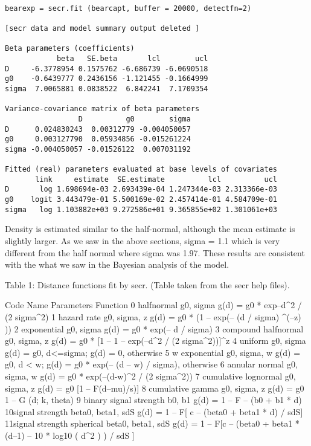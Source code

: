 {\small
\begin{verbatim}

bearexp = secr.fit (bearcapt, buffer = 20000, detectfn=2)

[secr data and model summary output deleted ]

Beta parameters (coefficients) 
            beta   SE.beta       lcl        ucl
D     -6.3778954 0.1575762 -6.686739 -6.0690518
g0    -0.6439777 0.2436156 -1.121455 -0.1664999
sigma  7.0065881 0.0838522  6.842241  7.1709354

Variance-covariance matrix of beta parameters 
                 D          g0        sigma
D      0.024830243  0.00312779 -0.004050057
g0     0.003127790  0.05934856 -0.015261224
sigma -0.004050057 -0.01526122  0.007031192

Fitted (real) parameters evaluated at base levels of covariates 
       link     estimate  SE.estimate          lcl          ucl
D       log 1.698694e-03 2.693439e-04 1.247344e-03 2.313366e-03
g0    logit 3.443479e-01 5.500169e-02 2.457414e-01 4.584709e-01
sigma   log 1.103882e+03 9.272586e+01 9.365855e+02 1.301061e+03

\end{verbatim}
}

Density is estimated similar to the half-normal, although the mean estimate is slightly larger.  As we saw in the above sections, sigma = 1.1 which is very different from the half normal where sigma was 1.97.  These results are consistent with the what we saw in the Bayesian analysis of the model.

\begin{comment} BETH: Put this table up in Section 1? \end{comment}

Table 1: Distance functions fit by secr.  (Table taken from the secr
help files).


Code Name Parameters Function 
0  halfnormal g0, sigma g(d) = g0 * exp{--d^2 / (2 sigma^2) } 
1 hazard rate g0, sigma, z g(d) = g0 * (1 -- exp(-- (d / sigma) ^(--z) )) 
2 exponential g0, sigma g(d) = g0 * exp(-- d / sigma) 
3 compound halfnormal g0, sigma, z g(d) = g0 * [1 -- {1 -- exp(--d^2 / (2 sigma^2))]^z} 
4 uniform g0, sigma g(d) = g0, d<=sigma; g(d) = 0, otherwise 
5 w exponential g0, sigma, w g(d) = g0, d < w; g(d) = g0 * exp(-- (d -- w) / sigma), otherwise 
6 annular normal g0, sigma, w g(d) = g0 * exp(--(d-w)^2 / (2 sigma^2)) 
7 cumulative lognormal g0, sigma, z g(d) = g0 [1 -- F{(d--mu)/s)}] 
8 cumulative gamma g0, sigma, z g(d) = g0 { 1 -- G (d; k, theta) } 
9 binary signal strength b0, b1 g(d) = 1 -- F {-- (b0 + b1 * d) } 
10signal strength beta0, beta1, sdS g(d) = 1 -- F[ {c -- (beta0 + beta1 * d)} / sdS] 
11signal strength spherical beta0, beta1, sdS g(d) = 1 -- F[{c -- (beta0 + beta1 * (d--1) -- 10 * log10 ( d^2 ) ) } / sdS ]



